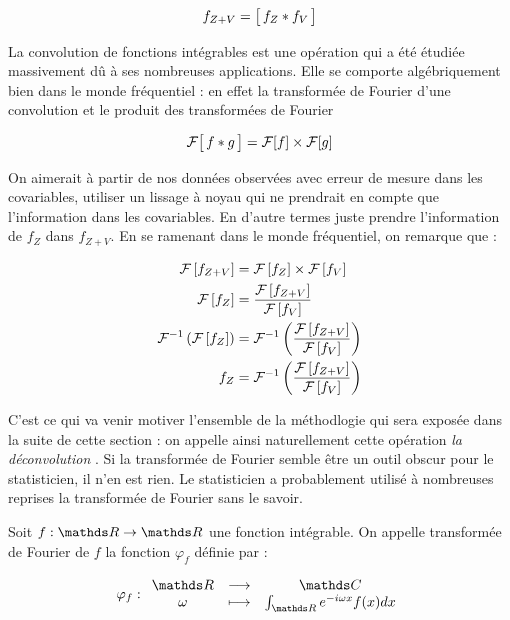\begin{equation}
    f_{Z+V} = \bigl[\, f_Z * f_V \, \bigr]
\end{equation}

La convolution de fonctions intégrables est une opération qui a été étudiée massivement dû à ses nombreuses applications. Elle se comporte algébriquement bien dans le monde fréquentiel : en effet la transformée de Fourier d'une convolution et le produit des transformées de Fourier

\begin{equation}
	\mathcal F \bigl[\, f * g \, \bigr] = \mathcal F[f] \times \mathcal F [g]
\end{equation}

On aimerait à partir de nos données observées avec erreur de mesure dans les covariables, utiliser un lissage à noyau qui ne prendrait en compte que l'information dans les covariables. En d'autre termes juste prendre l'information de $f_Z$ dans $f_{Z+V}$. En se ramenant dans le monde fréquentiel, on remarque que : 

\begin{align}
    \mathcal F \left[ f_{Z+V} \right] &= \mathcal F \left[ f_Z \right] \times \mathcal F \left[ f_V \right] \notag
    \\
    \mathcal F \left[ f_Z \right] &= \frac{\mathcal F \left[ f_{Z+V} \right]}{\mathcal F \left[ f_V \right]}
    \\
    \mathcal F ^ {-1} \left( \mathcal F \left[ f_Z \right] \right) &=  \mathcal F ^ {-1} \left( \frac{\mathcal F \left[ f_{Z+V} \right]}{\mathcal F \left[ f_V \right]} \right) \notag
    \\
    f_Z &= \mathcal F ^ {-1} \left( \frac{\mathcal F \left[ f_{Z+V} \right]}{\mathcal F \left[ f_V \right]} \right)
\end{align}

C'est ce qui va venir motiver l'ensemble de la méthodlogie qui sera exposée dans la suite de cette section : on appelle ainsi naturellement cette opération \emph{\og la déconvolution \fg}.
Si la transformée de Fourier semble être un outil obscur pour le statisticien, il n'en est rien. Le statisticien a probablement utilisé à nombreuses reprises la transformée de Fourier sans le savoir.

\begin{definition}
    Soit $f : \grandR \rightarrow \grandR$ une fonction intégrable.
    On appelle transformée de Fourier de $f$ la fonction $\varphi_f$ définie par :

    \begin{equation*}
        \varphi_f : \func
        {\grandR}{\mathds C}
        {\omega}{\int_{\grandR} e^{-i \omega x} f(x) dx}
    \end{equation*}
\end{definition}

